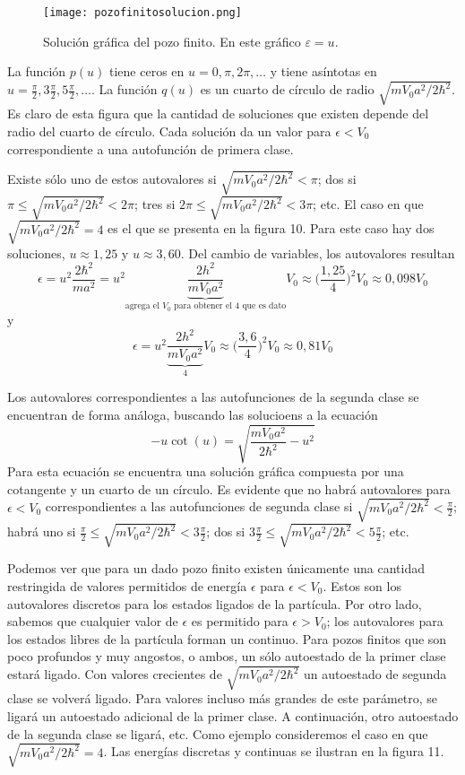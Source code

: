 \documentclass[12pt,a4paper]{article}
\def\e{{\epsilon}} %
\begin{document}
\begin{figure}[ht!]
\begin{center}
\texttt{[image: pozofinitosolucion.png]}
\caption{Solución gráfica del pozo finito. En este gráfico $\varepsilon=u$.}
\end{center}
\end{figure}

La función $p(u)$ tiene ceros en $u=0, \pi, 2\pi, \ldots$ y tiene asíntotas en $u=\frac{\pi}{2}, 3\frac{\pi}{2}, 5\frac{\pi}{2},\ldots$. La función $q(u)$ es un cuarto de círculo de radio $\sqrt{mV_{0}a^{2}/2\hbar^{2}}$. Es claro de esta figura que la cantidad de soluciones que existen depende del radio del cuarto de círculo. Cada solución da un valor para $\e<V_{0}$ correspondiente a una autofunción de primera clase.

Existe sólo uno de estos autovalores si $\sqrt{mV_{0}a^{2}/2\hbar^{2}}<\pi$; dos si $\pi \leq \sqrt{mV_{0}a^{2}/2\hbar^{2}}<2\pi$; tres si $2\pi \leq \sqrt{mV_{0}a^{2}/2\hbar^{2}} < 3\pi$; etc. El caso en que $\sqrt{mV_{0}a^{2}/2\hbar^{2}}=4$ es el que se presenta en la figura 10. Para este caso hay dos soluciones, $u \approx 1,25$ y $u \approx 3,60$. Del cambio de variables, los autovalores resultan
\[ \e=u^{2}\frac{2\hbar^{2}}{ma^{2}}=u^{2} \underbrace{ \frac{2h^{2}}{mV_{0}a^{2}}}_{\textrm{agrega el }V_{0}\textrm{ para obtener el }4 \textrm{ que es dato}} V_{0}\approx \bigg( \frac{1,25}{4} \bigg)^{2}V_{0} \approx 0,098 V_{0} \]
y
\[ \e=u^{2} \underbrace{ \frac{2h^{2}}{mV_{0}a^{2}}}_{4} V_{0} \approx \bigg( \frac{3,6}{4} \bigg)^{2} V_{0} \approx 0,81V_{0} \]

Los autovalores correspondientes a las autofunciones de la segunda clase se encuentran de forma análoga, buscando las solucioens a la ecuación
\[ -u \cot (u)=\sqrt{\frac{mV_{0}a^{2}}{2\hbar^{2}}-u^{2}} \]
Para esta ecuación se encuentra una solución gráfica compuesta por una cotangente y un cuarto de un círculo. Es evidente que no habrá autovalores para $\e<V_{0}$ correspondientes a las autofunciones de segunda clase si $\sqrt{mV_{0}a^{2}/2\hbar^{2}}<\frac{\pi}{2}$; habrá uno si $\frac{\pi}{2} \leq \sqrt{mV_{0}a^{2}/2\hbar^{2}}<3\frac{\pi}{2}$; dos si $3\frac{\pi}{2} \leq \sqrt{mV_{0}a^{2}/2\hbar^{2}}<5\frac{\pi}{2}$; etc.

Podemos ver que para un dado pozo finito existen únicamente una cantidad restringida de valores permitidos de energía $\e$ para $\e<V_{0}$. Estos son los autovalores discretos para los estados ligados de la partícula. Por otro lado, sabemos que cualquier valor de $\e$ es permitido para $\e>V_{0}$; los autovalores para los estados libres de la partícula forman un continuo. Para pozos finitos que son poco profundos y muy angostos, o ambos, un sólo autoestado de la primer clase estará ligado. Con valores crecientes de $\sqrt{mV_{0}a^{2}/2\hbar^{2}}$ un autoestado de segunda clase se volverá ligado. Para valores incluso más grandes de este parámetro, se ligará un autoestado adicional de la primer clase. A continuación, otro autoestado de la segunda clase se ligará, etc. Como ejemplo consideremos el caso en que $\sqrt{mV_{0}a^{2}/2\hbar^{2}}=4$. Las energías discretas y continuas se ilustran en la figura 11.
\end{document}
